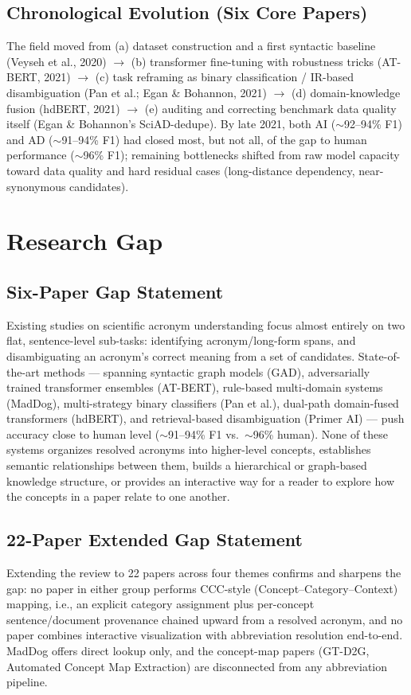 \documentclass[10pt,conference]{IEEEtran}
\begin{document}
\subsection{Chronological Evolution (Six Core Papers)}
The field moved from (a) dataset construction and a first syntactic baseline (Veyseh et al., 2020) $\rightarrow$ (b) transformer fine-tuning with robustness tricks (AT-BERT, 2021) $\rightarrow$ (c) task reframing as binary classification / IR-based disambiguation (Pan et al.; Egan \& Bohannon, 2021) $\rightarrow$ (d) domain-knowledge fusion (hdBERT, 2021) $\rightarrow$ (e) auditing and correcting benchmark data quality itself (Egan \& Bohannon's SciAD-dedupe). By late 2021, both AI ($\sim$92--94\% F1) and AD ($\sim$91--94\% F1) had closed most, but not all, of the gap to human performance ($\sim$96\% F1); remaining bottlenecks shifted from raw model capacity toward data quality and hard residual cases (long-distance dependency, near-synonymous candidates).

\section{Research Gap}
\subsection{Six-Paper Gap Statement}
Existing studies on scientific acronym understanding focus almost entirely on two flat, sentence-level sub-tasks: identifying acronym/long-form spans, and disambiguating an acronym's correct meaning from a set of candidates. State-of-the-art methods --- spanning syntactic graph models (GAD), adversarially trained transformer ensembles (AT-BERT), rule-based multi-domain systems (MadDog), multi-strategy binary classifiers (Pan et al.), dual-path domain-fused transformers (hdBERT), and retrieval-based disambiguation (Primer AI) --- push accuracy close to human level ($\sim$91--94\% F1 vs.\ $\sim$96\% human). None of these systems organizes resolved acronyms into higher-level concepts, establishes semantic relationships between them, builds a hierarchical or graph-based knowledge structure, or provides an interactive way for a reader to explore how the concepts in a paper relate to one another.

\subsection{22-Paper Extended Gap Statement}
Extending the review to 22 papers across four themes confirms and sharpens the gap: no paper in either group performs CCC-style (Concept--Category--Context) mapping, i.e., an explicit category assignment plus per-concept sentence/document provenance chained upward from a resolved acronym, and no paper combines interactive visualization with abbreviation resolution end-to-end. MadDog offers direct lookup only, and the concept-map papers (GT-D2G, Automated Concept Map Extraction) are disconnected from any abbreviation pipeline.
\end{document}
